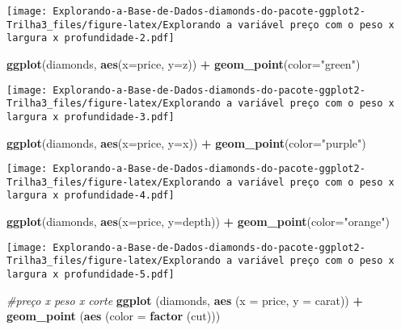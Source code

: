 \documentclass[
]{article}
\newenvironment{Shaded}{\begin{snugshade}}{\end{snugshade}}
\newcommand{\CommentTok}[1]{\textcolor[rgb]{0.56,0.35,0.01}{\textit{#1}}}
\newcommand{\DataTypeTok}[1]{\textcolor[rgb]{0.13,0.29,0.53}{#1}}
\newcommand{\KeywordTok}[1]{\textcolor[rgb]{0.13,0.29,0.53}{\textbf{#1}}}
\newcommand{\NormalTok}[1]{#1}
\newcommand{\OperatorTok}[1]{\textcolor[rgb]{0.81,0.36,0.00}{\textbf{#1}}}
\newcommand{\StringTok}[1]{\textcolor[rgb]{0.31,0.60,0.02}{#1}}
\begin{document}
\texttt{[image: Explorando-a-Base-de-Dados-diamonds-do-pacote-ggplot2-Trilha3\_files/figure-latex/Explorando a variável preço com o peso x largura x profundidade-2.pdf]}

\begin{Shaded}
\begin{Highlighting}[]
\KeywordTok{ggplot}\NormalTok{(diamonds, }\KeywordTok{aes}\NormalTok{(}\DataTypeTok{x=}\NormalTok{price, }\DataTypeTok{y=}\NormalTok{z)) }\OperatorTok{+}\StringTok{ }\KeywordTok{geom_point}\NormalTok{(}\DataTypeTok{color=}\StringTok{"green"}\NormalTok{)}
\end{Highlighting}
\end{Shaded}

\texttt{[image: Explorando-a-Base-de-Dados-diamonds-do-pacote-ggplot2-Trilha3\_files/figure-latex/Explorando a variável preço com o peso x largura x profundidade-3.pdf]}

\begin{Shaded}
\begin{Highlighting}[]
\KeywordTok{ggplot}\NormalTok{(diamonds, }\KeywordTok{aes}\NormalTok{(}\DataTypeTok{x=}\NormalTok{price, }\DataTypeTok{y=}\NormalTok{x)) }\OperatorTok{+}\StringTok{ }\KeywordTok{geom_point}\NormalTok{(}\DataTypeTok{color=}\StringTok{"purple"}\NormalTok{)}
\end{Highlighting}
\end{Shaded}

\texttt{[image: Explorando-a-Base-de-Dados-diamonds-do-pacote-ggplot2-Trilha3\_files/figure-latex/Explorando a variável preço com o peso x largura x profundidade-4.pdf]}

\begin{Shaded}
\begin{Highlighting}[]
\KeywordTok{ggplot}\NormalTok{(diamonds, }\KeywordTok{aes}\NormalTok{(}\DataTypeTok{x=}\NormalTok{price, }\DataTypeTok{y=}\NormalTok{depth)) }\OperatorTok{+}\StringTok{ }\KeywordTok{geom_point}\NormalTok{(}\DataTypeTok{color=}\StringTok{"orange"}\NormalTok{)}
\end{Highlighting}
\end{Shaded}

\texttt{[image: Explorando-a-Base-de-Dados-diamonds-do-pacote-ggplot2-Trilha3\_files/figure-latex/Explorando a variável preço com o peso x largura x profundidade-5.pdf]}

\begin{Shaded}
\begin{Highlighting}[]
\CommentTok{#preço x peso x corte}
\KeywordTok{ggplot}\NormalTok{ (diamonds, }\KeywordTok{aes}\NormalTok{ (}\DataTypeTok{x =}\NormalTok{ price, }\DataTypeTok{y =}\NormalTok{ carat)) }\OperatorTok{+}\StringTok{ }\KeywordTok{geom_point}\NormalTok{ (}\KeywordTok{aes}\NormalTok{ (}\DataTypeTok{color =} \KeywordTok{factor}\NormalTok{ (cut)))}
\end{Highlighting}
\end{Shaded}
\end{document}

